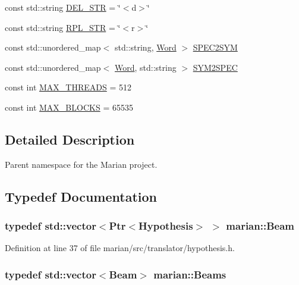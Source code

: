 \begin{DoxyCompactItemize}
\item 
const std\+::string \hyperlink{namespacemarian_aa9c98f79752cd2294cae93a90ffcf9d3}{D\+E\+L\+\_\+\+S\+TR} = \char`\"{}$<$d$>$\char`\"{}
\item 
const std\+::string \hyperlink{namespacemarian_a0609886bc1d9c2f4fc75e5e9fc6905ad}{R\+P\+L\+\_\+\+S\+TR} = \char`\"{}$<$r$>$\char`\"{}
\item 
const std\+::unordered\+\_\+map$<$ std\+::string, \hyperlink{namespacemarian_a5db8bee455c97a62d6a525dc48efe4c2}{Word} $>$ \hyperlink{namespacemarian_a53db7e8e290296787decc0fd95948535}{S\+P\+E\+C2\+S\+YM}
\item 
const std\+::unordered\+\_\+map$<$ \hyperlink{namespacemarian_a5db8bee455c97a62d6a525dc48efe4c2}{Word}, std\+::string $>$ \hyperlink{namespacemarian_a70398af3e3d1cc14ff372edcdc1a2595}{S\+Y\+M2\+S\+P\+EC}
\item 
const int \hyperlink{namespacemarian_ac3c48e15e9e2d80e8028b1688190a9e7}{M\+A\+X\+\_\+\+T\+H\+R\+E\+A\+DS} = 512
\item 
const int \hyperlink{namespacemarian_a596290b68dad437e90054f558f7d2d83}{M\+A\+X\+\_\+\+B\+L\+O\+C\+KS} = 65535
\end{DoxyCompactItemize}


\subsection{Detailed Description}
Parent namespace for the Marian project. 

\subsection{Typedef Documentation}
\subsubsection[{\texorpdfstring{Beam}{Beam}}]{\setlength{\rightskip}{0pt plus 5cm}typedef std\+::vector$<${\bf Ptr}$<${\bf Hypothesis}$>$ $>$ {\bf marian\+::\+Beam}}\hypertarget{namespacemarian_aebdf5ddcd9e7774939696be6e1ceb8f0}{}\label{namespacemarian_aebdf5ddcd9e7774939696be6e1ceb8f0}


Definition at line 37 of file marian/src/translator/hypothesis.\+h.

\subsubsection[{\texorpdfstring{Beams}{Beams}}]{\setlength{\rightskip}{0pt plus 5cm}typedef std\+::vector$<${\bf Beam}$>$ {\bf marian\+::\+Beams}}\hypertarget{namespacemarian_a441398c850e4cb52313dba352de1a1bc}{}\label{namespacemarian_a441398c850e4cb52313dba352de1a1bc}


